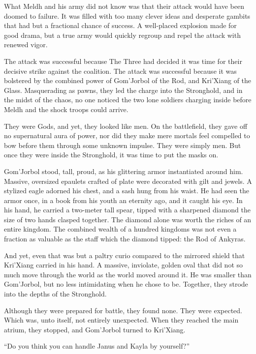 What Meldh and his army did not know was that their attack would have been doomed to failure. It was filled with too many clever ideas and desperate gambits that had but a fractional chance of success. A well-placed explosion made for good drama, but a true army would quickly regroup and repel the attack with renewed vigor.

The attack was successful because The Three had decided it was time for their decisive strike against the coalition. The attack was successful because it was bolstered by the combined power of Gom’Jorbol of the Rod, and Kri’Xiang of the Glass. Masquerading as pawns, they led the charge into the Stronghold, and in the midst of the chaos, no one noticed the two lone soldiers charging inside before Meldh and the shock troops could arrive.

They were Gods, and yet, they looked like men. On the battlefield, they gave off no supernatural aura of power, nor did they make mere mortals feel compelled to bow before them through some unknown impulse. They were simply men. But once they were inside the Stronghold, it was time to put the masks on.

Gom’Jorbol stood, tall, proud, as his glittering armor instantiated around him. Massive, oversized epaulets crafted of plate were decorated with gilt and jewels. A stylized eagle adorned his chest, and a sash hung from his waist. He had seen the armor once, in a book from his youth an eternity ago, and it caught his eye. In his hand, he carried a two-meter tall spear, tipped with a sharpened diamond the size of two hands clasped together. The diamond alone was worth the riches of an entire kingdom. The combined wealth of a hundred kingdoms was not even a fraction as valuable as the staff which the diamond tipped: the Rod of Ankyras.

And yet, even that was but a paltry curio compared to the mirrored shield that Kri’Xiang carried in his hand. A massive, inviolate, golden oval that did not so much move through the world as the world moved around it. He was smaller than Gom’Jorbol, but no less intimidating when he chose to be. Together, they strode into the depths of the Stronghold.

Although they were prepared for battle, they found none. They were expected. Which was, unto itself, not entirely unexpected. When they reached the main atrium, they stopped, and Gom’Jorbol turned to Kri’Xiang.

“Do you think you can handle Janus and Kayla by yourself?”

